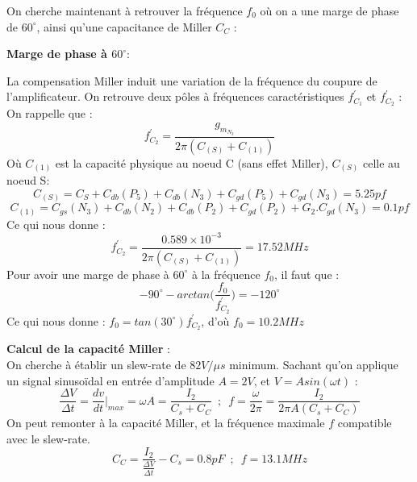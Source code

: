 \documentclass[11pt]{article}
\begin{document}
On cherche maintenant \`a retrouver la fr\'equence $f_0$ o\`u on a une marge de phase de $60^{\circ}$, ainsi
qu'une capacitance de Miller $C_C$ :

\textbf{Marge de phase \`a $60^{\circ}$}:

La compensation Miller induit une variation de la fr\'equence du coupure de l'amplificateur. On retrouve deux p\^oles \`a fr\'equences caract\'eristiques $f^{'}_{C_1}$ et $f^{'}_{C_2}$ :
On rappelle que :
\[
f^{'}_{C_2} = \frac{g_m_{N_3}}{2\pi (C_{(S)} + C_{(1)})}
\]
O\`u $C_{(1)}$ est la capacit\'e physique au noeud C (sans effet Miller), $C_{(S)}$ celle au noeud S:
\[
C_{(S)} = C_S + C_{db} (P_5) + C_{db}(N_3) + C_{gd}(P_5) + C_{gd}(N_3) = 5.25 pf
\]
\[
C_{(1)} = C_{gs}(N_3) + C_{db} (N_2) + C_{db}(P_2) + C_{gd}(P_2)+G_{2} . C_{gd}(N_3) = 0.1 pf
\]
Ce qui nous donne :
\[
f^{'}_{C_2} = \frac{0.589\times10^{-3}}{2\pi (C_{(S)} + C_{(1)})} = 17.52 MHz
\]
Pour avoir une marge de phase \`a $60^{\circ}$ \`a la fr\'equence $f_0$, il faut que :
\[
-90^{\circ} - arctan\Bigg( \frac{f_0}{f^{'}_{C_{2}}}  \Bigg) = -120^{\circ} 
\]
Ce qui nous donne : $f_0 = tan(30^{\circ})f^{'}_{C_{2}}$, d'o\`u $f_0 = 10.2 MHz$

\textbf{Calcul de la capacit\'e Miller} :\\
On cherche \`a \'etablir un slew-rate de $82 V/\mu s$ minimum.
Sachant qu'on applique un signal sinuso\"idal en entr\'ee d'amplitude $A = 2 V$, et $V=Asin(\omega t)$ :
\[
\frac{\Delta V}{\Delta t} = \frac{dv}{dt} \bigg|_{max} = \omega A = \frac{I_2}{C_s + C_C}
\phantom{3}
;
\phantom{3}
f = \frac{\omega}{2\pi} = \frac{I_2}{2\pi A (C_s + C_C)} 
\]
On peut remonter \`a la capacit\'e Miller, et la fr\'equence maximale $f$ compatible avec le slew-rate.
\[
C_C = \frac{I_2}{\frac{\Delta V}{\Delta t}} - C_s = 0.8 pF
\phantom{3}
;
\phantom{3}
f = 13.1 MHz
\]

\clearpage

\end{document}
